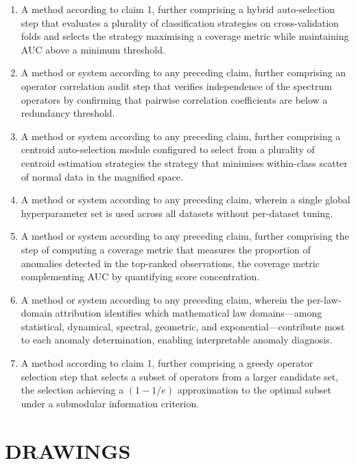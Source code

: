 \documentclass[12pt,a4paper]{article}
\begin{document}
\begin{enumerate}[label=\textbf{\arabic*.}]
\item A method according to claim 1, further comprising a hybrid 
auto-selection step that evaluates a plurality of classification strategies 
on cross-validation folds and selects the strategy maximising a coverage 
metric while maintaining AUC above a minimum threshold.

\item A method or system according to any preceding claim, further 
comprising an operator correlation audit step that verifies independence 
of the spectrum operators by confirming that pairwise correlation 
coefficients are below a redundancy threshold.

\item A method or system according to any preceding claim, further 
comprising a centroid auto-selection module configured to select from a 
plurality of centroid estimation strategies the strategy that minimises 
within-class scatter of normal data in the magnified space.

\item A method or system according to any preceding claim, wherein a 
single global hyperparameter set is used across all datasets without 
per-dataset tuning.

\item A method or system according to any preceding claim, further 
comprising the step of computing a coverage metric that measures the 
proportion of anomalies detected in the top-ranked observations, the 
coverage metric complementing AUC by quantifying score concentration.

\item A method or system according to any preceding claim, wherein the per-law-domain attribution identifies which mathematical law domains---among 
statistical, dynamical, spectral, geometric, and exponential---contribute 
most to each anomaly determination, enabling interpretable anomaly 
diagnosis.

\item A method according to claim 1, further comprising a greedy operator 
selection step that selects a subset of operators from a larger candidate 
set, the selection achieving a $(1 - 1/e)$ approximation to the optimal 
subset under a submodular information criterion.

\end{enumerate}

\section{DRAWINGS}
\end{document}
